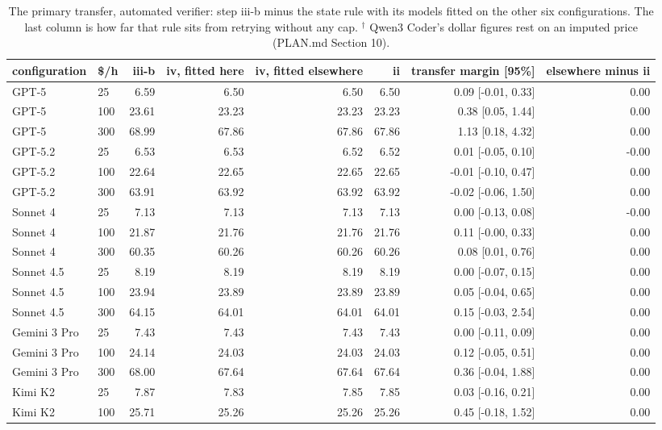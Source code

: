 \begin{table}[t]
\centering
\small
\caption{The primary transfer, automated verifier: step iii-b minus the state rule with its models fitted on the other six configurations. The last column is how far that rule sits from retrying without any cap. $^\dagger$ Qwen3 Coder's dollar figures rest on an imputed price (PLAN.md Section 10).}
\label{tab:table3_transfer}
\begin{tabular}{llrrrrrr}
\toprule
configuration & \$/h & iii-b & iv, fitted here & iv, fitted elsewhere & ii & transfer margin [95\%] & elsewhere minus ii \\
\midrule
GPT-5 & 25 & 6.59 & 6.50 & 6.50 & 6.50 & 0.09 [-0.01, 0.33] & 0.00 \\
GPT-5 & 100 & 23.61 & 23.23 & 23.23 & 23.23 & 0.38 [0.05, 1.44] & 0.00 \\
GPT-5 & 300 & 68.99 & 67.86 & 67.86 & 67.86 & 1.13 [0.18, 4.32] & 0.00 \\
\midrule
GPT-5.2 & 25 & 6.53 & 6.53 & 6.52 & 6.52 & 0.01 [-0.05, 0.10] & -0.00 \\
GPT-5.2 & 100 & 22.64 & 22.65 & 22.65 & 22.65 & -0.01 [-0.10, 0.47] & 0.00 \\
GPT-5.2 & 300 & 63.91 & 63.92 & 63.92 & 63.92 & -0.02 [-0.06, 1.50] & 0.00 \\
\midrule
Sonnet 4 & 25 & 7.13 & 7.13 & 7.13 & 7.13 & 0.00 [-0.13, 0.08] & -0.00 \\
Sonnet 4 & 100 & 21.87 & 21.76 & 21.76 & 21.76 & 0.11 [-0.00, 0.33] & 0.00 \\
Sonnet 4 & 300 & 60.35 & 60.26 & 60.26 & 60.26 & 0.08 [0.01, 0.76] & 0.00 \\
\midrule
Sonnet 4.5 & 25 & 8.19 & 8.19 & 8.19 & 8.19 & 0.00 [-0.07, 0.15] & 0.00 \\
Sonnet 4.5 & 100 & 23.94 & 23.89 & 23.89 & 23.89 & 0.05 [-0.04, 0.65] & 0.00 \\
Sonnet 4.5 & 300 & 64.15 & 64.01 & 64.01 & 64.01 & 0.15 [-0.03, 2.54] & 0.00 \\
\midrule
Gemini 3 Pro & 25 & 7.43 & 7.43 & 7.43 & 7.43 & 0.00 [-0.11, 0.09] & 0.00 \\
Gemini 3 Pro & 100 & 24.14 & 24.03 & 24.03 & 24.03 & 0.12 [-0.05, 0.51] & 0.00 \\
Gemini 3 Pro & 300 & 68.00 & 67.64 & 67.64 & 67.64 & 0.36 [-0.04, 1.88] & 0.00 \\
\midrule
Kimi K2 & 25 & 7.87 & 7.83 & 7.85 & 7.85 & 0.03 [-0.16, 0.21] & 0.00 \\
Kimi K2 & 100 & 25.71 & 25.26 & 25.26 & 25.26 & 0.45 [-0.18, 1.52] & 0.00 \\

\end{tabular}
\end{table}
